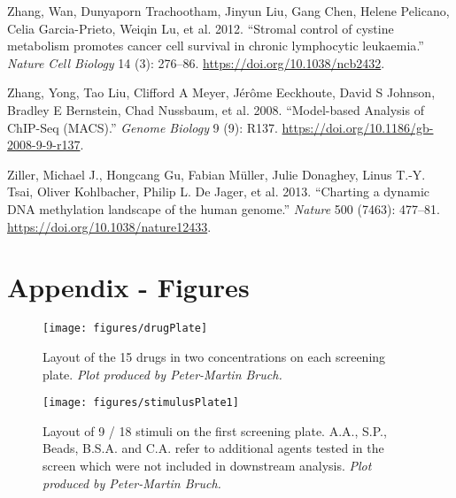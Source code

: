\documentclass[11pt, a4paper, twosided]{book}
\newenvironment{CSLReferences}%
  {}%
  {\par}
\begin{document}
\begin{CSLReferences}{1}{0}
\leavevmode{}%
Zhang, Wan, Dunyaporn Trachootham, Jinyun Liu, Gang Chen, Helene Pelicano, Celia Garcia-Prieto, Weiqin Lu, et al. 2012. {``{Stromal control of cystine metabolism promotes cancer cell survival in chronic lymphocytic leukaemia}.''} \emph{Nature Cell Biology} 14 (3): 276--86. \url{https://doi.org/10.1038/ncb2432}.

\leavevmode{}%
Zhang, Yong, Tao Liu, Clifford A Meyer, Jérôme Eeckhoute, David S Johnson, Bradley E Bernstein, Chad Nussbaum, et al. 2008. {``{Model-based Analysis of ChIP-Seq (MACS)}.''} \emph{Genome Biology} 9 (9): R137. \url{https://doi.org/10.1186/gb-2008-9-9-r137}.

\leavevmode{}%
Ziller, Michael J., Hongcang Gu, Fabian Müller, Julie Donaghey, Linus T.-Y. Tsai, Oliver Kohlbacher, Philip L. De Jager, et al. 2013. {``{Charting a dynamic DNA methylation landscape of the human genome}.''} \emph{Nature} 500 (7463): 477--81. \url{https://doi.org/10.1038/nature12433}.

\end{CSLReferences}
\indent
\setlength{\parindent}{17pt}
\setlength{\leftskip}{0pt}
\setlength{\parskip}{0pt}

\newpage

\hypertarget{appendix-appendix}{%
\appendix}


\hypertarget{appendix---figures}{%
\chapter*{Appendix - Figures}\label{appendix---figures}}


\begin{figure}

{\centering \texttt{[image: figures/drugPlate]} 

}

\caption{Layout of the 15 drugs in two concentrations on each screening plate. \emph{Plot produced by Peter-Martin Bruch.}}\label{fig:drugPlot}
\end{figure}

\begin{figure}

{\centering \texttt{[image: figures/stimulusPlate1]} 

}

\caption{Layout of 9 / 18 stimuli on the first screening plate. A.A., S.P., Beads, B.S.A. and C.A. refer to additional agents tested in the screen which were not included in downstream analysis. \emph{Plot produced by Peter-Martin Bruch.}}\label{fig:stimulusPlot1}
\end{figure}
\end{document}
